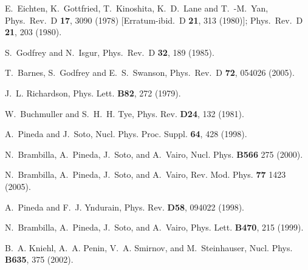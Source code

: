 \documentclass[twocolumn,showpacs,superscriptaddress,preprintnumbers,nofootinbib,prd]{revtex4-1}
\begin{document}
\begin{thebibliography}{}

  E.~Eichten, K.~Gottfried, T.~Kinoshita, K.~D.~Lane and T.~-M.~Yan,
  Phys.\ Rev.\ D {\bf 17}, 3090 (1978)
  [Erratum-ibid.\ D {\bf 21}, 313 (1980)];
  Phys.\ Rev.\ D {\bf 21}, 203 (1980).	
	
  S.~Godfrey and N.~Isgur,
  Phys.\ Rev.\ D {\bf 32}, 189 (1985).
	
  T.~Barnes, S.~Godfrey and E.~S.~Swanson,
  Phys.\ Rev.\ D {\bf 72}, 054026 (2005).

J.~L. Richardson, %
Phys. Lett. {\bf B82}, 272 (1979).

W.~Buchmuller and S.~H.~H. Tye, %
Phys. Rev. {\bf D24}, 132 (1981).

A.~Pineda and J.~Soto, %
Nucl. Phys. Proc. Suppl. {\bf 64}, 428 (1998).

N.~Brambilla, A.~Pineda, J.~Soto, and A.~Vairo, %
Nucl. Phys. {\bf B566} 275 (2000).

N.~Brambilla, A.~Pineda, J.~Soto, and A.~Vairo,
Rev. Mod. Phys. {\bf 77} 1423 (2005).

A.~Pineda and F.~J. Yndurain, %
Phys. Rev. {\bf D58}, 094022 (1998).

N.~Brambilla, A.~Pineda, J.~Soto, and A.~Vairo,
Phys. Lett. {\bf B470}, 215 (1999).

B.~A. Kniehl, A.~A. Penin, V.~A. Smirnov, and M.~Steinhauser,
Nucl. Phys. {\bf B635}, 375 (2002).


\end{thebibliography}
\end{document}
